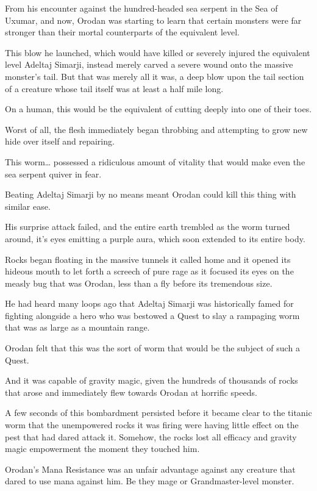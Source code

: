 \documentclass[a4paper,10pt]{book}
\begin{document}
From his encounter against the hundred-headed sea serpent in the Sea of Uxumar, and now, Orodan was starting to learn that certain monsters were far stronger than their mortal counterparts of the equivalent level.\par
This blow he launched, which would have killed or severely injured the equivalent level Adeltaj Simarji, instead merely carved a severe wound onto the massive monster’s tail. But that was merely all it was, a deep blow upon the tail section of a creature whose tail itself was at least a half mile long.\par
On a human, this would be the equivalent of cutting deeply into one of their toes.\par
Worst of all, the flesh immediately began throbbing and attempting to grow new hide over itself and repairing.\par
This worm… possessed a ridiculous amount of vitality that would make even the sea serpent quiver in fear.\par
Beating Adeltaj Simarji by no means meant Orodan could kill this thing with similar ease.\par
His surprise attack failed, and the entire earth trembled as the worm turned around, it’s eyes emitting a purple aura, which soon extended to its entire body.\par
Rocks began floating in the massive tunnels it called home and it opened its hideous mouth to let forth a screech of pure rage as it focused its eyes on the measly bug that was Orodan, less than a fly before its tremendous size.\par
He had heard many loops ago that Adeltaj Simarji was historically famed for fighting alongside a hero who was bestowed a Quest to slay a rampaging worm that was as large as a mountain range.\par
Orodan felt that this was the sort of worm that would be the subject of such a Quest.\par
And it was capable of gravity magic, given the hundreds of thousands of rocks that arose and immediately flew towards Orodan at horrific speeds.\par
A few seconds of this bombardment persisted before it became clear to the titanic worm that the unempowered rocks it was firing were having little effect on the pest that had dared attack it. Somehow, the rocks lost all efficacy and gravity magic empowerment the moment they touched him.\par
Orodan’s Mana Resistance was an unfair advantage against any creature that dared to use mana against him. Be they mage or Grandmaster-level monster.\par
\end{document}
